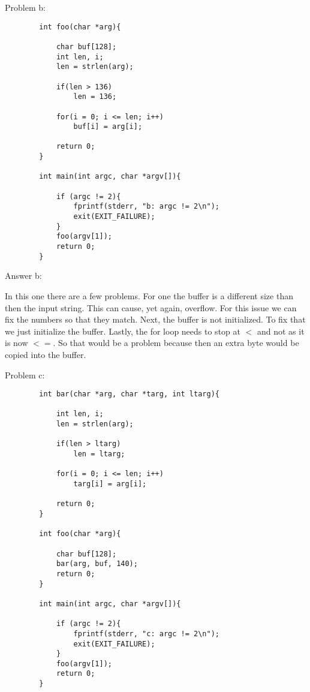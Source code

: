 \documentclass[11pt]{article}
\begin{document}
	\bigskip
	
	Problem b:
	
	\bigskip
	
	\begin{lstlisting}
		int foo(char *arg){
		
			char buf[128];
			int len, i;
			len = strlen(arg);
		
			if(len > 136)		
				len = 136;

			for(i = 0; i <= len; i++)
				buf[i] = arg[i];
			
			return 0;
		}
		
		int main(int argc, char *argv[]){
		
			if (argc != 2){
				fprintf(stderr, "b: argc != 2\n");
				exit(EXIT_FAILURE);
			}
			foo(argv[1]);
			return 0;
		}
	\end{lstlisting}
	
	\bigskip
	
	Answer b:
	
	\bigskip
	
	In this one there are a few problems. For one the buffer is a different size than then the input string. This can cause, yet again, overflow. For this issue we can fix the numbers so that they match. Next, the buffer is not initialized. To fix that we just initialize the buffer. Lastly, the for loop needs to stop at $<$ and not as it is now $<=$. So that would be a problem because then an extra byte would be copied into the buffer.
	
	\bigskip
	
	Problem c:
	
	\bigskip
	
	\begin{lstlisting}
		int bar(char *arg, char *targ, int ltarg){
		
			int len, i;
			len = strlen(arg);
		
			if(len > ltarg)
				len = ltarg;
		
			for(i = 0; i <= len; i++)
				targ[i] = arg[i];
				
			return 0;
		}
		
		int foo(char *arg){
		
			char buf[128];
			bar(arg, buf, 140);
			return 0;
		}
		
		int main(int argc, char *argv[]){
		
			if (argc != 2){
				fprintf(stderr, "c: argc != 2\n");
				exit(EXIT_FAILURE);
			}
			foo(argv[1]);
			return 0;
		}
	\end{lstlisting}
	
\end{document}

